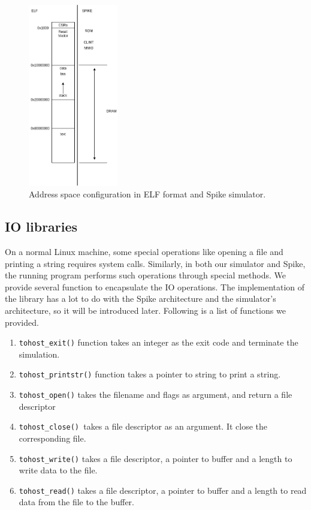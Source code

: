 \begin{figure}[!htp]
    \centering
    \includegraphics[width=0.35\textwidth]{figure/450-mem.png}
    \caption{Address space configuration in ELF format and Spike simulator.}
    \label{fig:450-addr-sapce}
\end{figure}

\subsection{IO libraries} %
On a normal Linux machine, some special operations like opening a file and printing a string requires system calls. Similarly, in both our simulator and Spike, the running program performs such operations through special methods. We provide several function to encapsulate the IO operations. The implementation of the library has a lot to do with the Spike architecture and the simulator's architecture, so it will be introduced later. Following is a list of functions we provided.

\begin{enumerate}
    \item \texttt{tohost\_exit()} function takes an integer as the exit code and terminate the simulation.
    \item \texttt{tohost\_printstr()} function takes a pointer to string to print a string.
    \item \texttt{tohost\_open()} takes the filename and flags as argument, and return a file descriptor
    \item \texttt{tohost\_close() }takes a file descriptor as an argument. It close the corresponding file.
    \item \texttt{tohost\_write()} takes a file descriptor, a pointer to buffer and a length to write data to the file.
    \item \texttt{tohost\_read()} takes a file descriptor, a pointer to buffer and a length to read data from the file to the buffer.
\end{enumerate}

